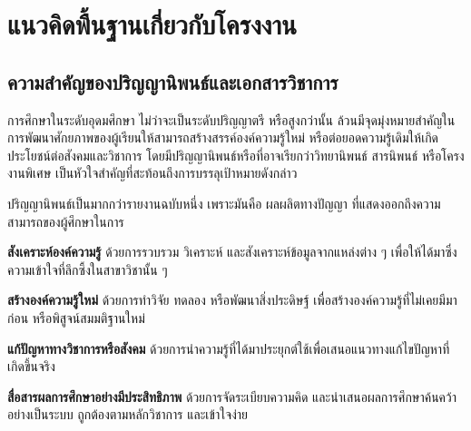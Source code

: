 
\section{แนวคิดพื้นฐานเกี่ยวกับโครงงาน}

\subsection{ความสำคัญของปริญญานิพนธ์และเอกสารวิชาการ}

\hspace*{1.5em} %
การศึกษาในระดับอุดมศึกษา ไม่ว่าจะเป็นระดับปริญญาตรี หรือสูงกว่านั้น ล้วนมีจุดมุ่งหมายสำคัญในการพัฒนาศักยภาพของผู้เรียนให้สามารถสร้างสรรค์องค์ความรู้ใหม่ หรือต่อยอดความรู้เดิมให้เกิดประโยชน์ต่อสังคมและวิชาการ โดยมีปริญญานิพนธ์หรือที่อาจเรียกว่าวิทยานิพนธ์ สารนิพนธ์ หรือโครงงานพิเศษ เป็นหัวใจสำคัญที่สะท้อนถึงการบรรลุเป้าหมายดังกล่าว

\hspace*{1.5em} %
ปริญญานิพนธ์เป็นมากกว่ารายงานฉบับหนึ่ง เพราะมันคือ ผลผลิตทางปัญญา ที่แสดงออกถึงความสามารถของผู้ศึกษาในการ
\begin{mycustomitem}
    \item \textbf{สังเคราะห์องค์ความรู้} ด้วยการรวบรวม วิเคราะห์ และสังเคราะห์ข้อมูลจากแหล่งต่าง ๆ เพื่อให้ได้มาซึ่งความเข้าใจที่ลึกซึ้งในสาขาวิชานั้น ๆ
    \item \textbf{สร้างองค์ความรู้ใหม่} ด้วยการทำวิจัย ทดลอง หรือพัฒนาสิ่งประดิษฐ์ เพื่อสร้างองค์ความรู้ที่ไม่เคยมีมาก่อน หรือพิสูจน์สมมติฐานใหม่
    \item \textbf{แก้ปัญหาทางวิชาการหรือสังคม} ด้วยการนำความรู้ที่ได้มาประยุกต์ใช้เพื่อเสนอแนวทางแก้ไขปัญหาที่เกิดขึ้นจริง
    \item \textbf{สื่อสารผลการศึกษาอย่างมีประสิทธิภาพ} ด้วยการจัดระเบียบความคิด และนำเสนอผลการศึกษาค้นคว้าอย่างเป็นระบบ ถูกต้องตามหลักวิชาการ และเข้าใจง่าย
\end{mycustomitem}

